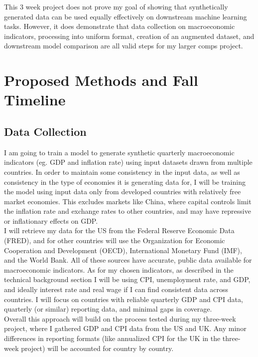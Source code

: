 \documentclass[10pt,twocolumn]{article}
\begin{document}
This 3 week project does not prove my goal of showing that synthetically generated data can be used equally effectively on downstream machine learning tasks. However, it does demonstrate that data collection on macroeconomic indicators, processing into uniform format, creation of an augmented dataset, and downstream model comparison are all valid steps for my larger comps project.

\section{Proposed Methods and Fall Timeline}

\subsection{Data Collection}
I am going to train a model to generate synthetic quarterly macroeconomic indicators (eg. GDP and inflation rate) using input datasets drawn from multiple countries. In order to maintain some consistency in the input data, as well as consistency in the type of economies it is generating data for, I will be training the model using input data only from developed countries with relatively free market economies. This excludes markets like China, where capital controls limit the inflation rate and exchange rates to other countries, and may have repressive or inflationary effects on GDP.\\
\indent{}I will retrieve my data for the US from the Federal Reserve Economic Data (FRED), and for other countries will use the Organization for Economic Cooperation and Development (OECD), International Monetary Fund (IMF), and the World Bank. All of these sources have accurate, public data available for macroeconomic indicators. As for my chosen indicators, as described in the technical background section I will be using CPI, unemployment rate, and GDP, and ideally interest rate and real wage if I can find consistent data across countries. I will focus on countries with reliable quarterly GDP and CPI data, quarterly (or similar) reporting data, and minimal gaps in coverage. \\ 
\indent{} Overall this approach will build on the process tested during my three-week project, where I gathered GDP and CPI data from the US and UK. Any minor differences in reporting formats (like annualized CPI for the UK in the three-week project) will be accounted for country by country.\\
\end{document}
